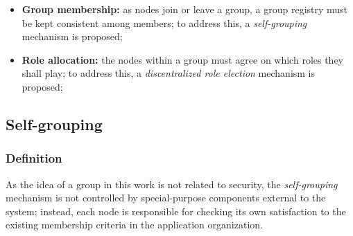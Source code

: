 \begin{itemize}
	
	\item \textbf{Group membership:} as nodes join or leave a group, a group registry must be kept consistent among members;
	to address this, a \textit{self-grouping} mechanism is proposed;
	
	\item \textbf{Role allocation:} the nodes within a group must agree on which roles they shall play; to address this, a  \textit{discentralized role election} mechanism is proposed;
	
%	
	
\end{itemize}


\subsection{Self-grouping} 




\subsubsection{\textbf{Definition}} As the idea of a group in this work is not related to security, the \textit{self-grouping} mechanism is not controlled by special-purpose components external to the system; instead, each node is responsible for checking its own satisfaction to the existing membership criteria in the application organization. 

